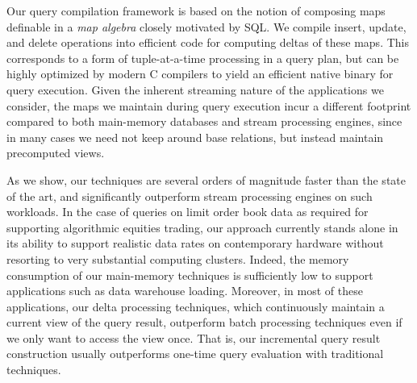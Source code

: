 \medskip







Our query compilation framework is based on the notion of composing maps
definable in a {\em map algebra}\/ closely motivated by SQL.
We compile insert, update, and delete operations into efficient code for computing
deltas of these maps. This corresponds to a form of
tuple-at-a-time processing in a query plan, but can be highly optimized by
modern C compilers to yield an efficient native binary for query execution.
Given the inherent streaming nature of the applications we consider, the maps we
maintain during query execution incur a different footprint compared to both
main-memory databases and stream processing engines, since in many cases we need
not keep around base relations, but instead maintain precomputed
views.



As we  show, our techniques are several orders of  magnitude   faster  than
the state of the art,  and significantly outperform stream processing
engines on such workloads.  In the case of queries on limit order  book  data  as
 required for  supporting  algorithmic  equities trading, our approach currently
stands alone in its ability to support realistic  data rates  on contemporary
hardware without  resorting to very substantial computing clusters. Indeed, the
memory consumption of our main-memory techniques is sufficiently low to support
applications such as data warehouse loading. Moreover, in most of these
applications, our delta processing techniques, which continuously maintain a
current view of the query result, outperform batch processing techniques even if
we only want to access the view once. That is, our incremental query result
construction usually outperforms one-time query evaluation with traditional
techniques.


